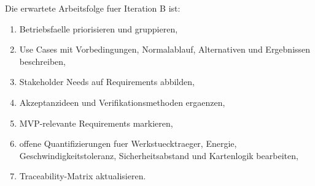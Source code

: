 Die erwartete Arbeitsfolge fuer Iteration B ist:
\begin{enumerate}
  \item Betriebsfaelle priorisieren und gruppieren,
  \item Use Cases mit Vorbedingungen, Normalablauf, Alternativen und Ergebnissen beschreiben,
  \item Stakeholder Needs auf Requirements abbilden,
  \item Akzeptanzideen und Verifikationsmethoden ergaenzen,
  \item MVP-relevante Requirements markieren,
  \item offene Quantifizierungen fuer Werkstuecktraeger, Energie, Geschwindigkeitstoleranz, Sicherheitsabstand und Kartenlogik bearbeiten,
  \item Traceability-Matrix aktualisieren.
\end{enumerate}
